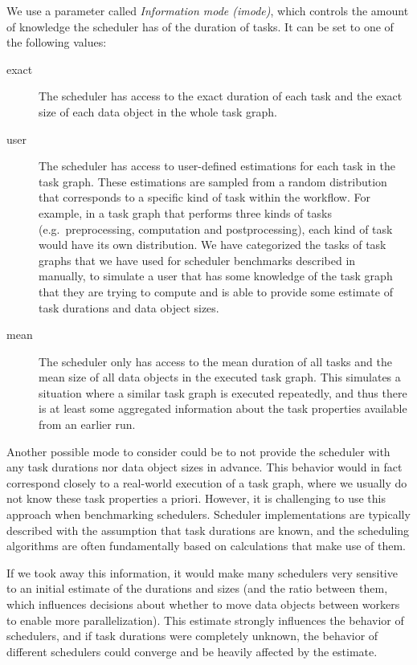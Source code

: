 \begin{description}[wide=0pt]
		We use a parameter called \emph{Information mode (imode)}, which controls the amount of knowledge the
		scheduler has of the duration of tasks. It can be set to one of the following values:
		\begin{description}
			\item[exact] The scheduler has access to the exact duration of each task and the exact size of each data object
				in the whole task graph.
			\item[user] The scheduler has access to user-defined estimations for each task in the task graph. These
				estimations are sampled from a random distribution that corresponds to a specific kind of task
				within the workflow. For example, in a task graph that performs three kinds of tasks (e.g.\
				preprocessing, computation and postprocessing), each kind of task would have its own distribution.
				We have categorized the tasks of task graphs that we have used for scheduler benchmarks described
				in~\Autoref{sec:estee-benchmarks} manually, to simulate a user that has some knowledge of the task graph
				that they are trying to compute and is able to provide some estimate of task durations and data
				object sizes.
			\item[mean] The scheduler only has access to the mean duration of all tasks and the mean size of all data
				objects in the executed task graph. This simulates a situation where a similar task graph is
				executed repeatedly, and thus there is at least some aggregated information about the task
				properties available from an earlier run.
		\end{description}
		Another possible mode to consider could be to not provide the scheduler with any task durations nor
		data object sizes in advance. This behavior would in fact correspond closely to a real-world
		execution of a task graph, where we usually do not know these task properties a priori. However, it
		is challenging to use this approach when benchmarking schedulers. Scheduler implementations are
		typically described with the assumption that task durations are known, and the scheduling
		algorithms are often fundamentally based on calculations that make use of them.

		If we took away this information, it would make many schedulers very sensitive to an initial
		estimate of the durations and sizes (and the ratio between them, which influences decisions about
		whether to move data objects between workers to enable more parallelization). This estimate
		strongly influences the behavior of schedulers, and if task durations were completely unknown, the
		behavior of different schedulers could converge and be heavily affected by the estimate.


\end{description}
